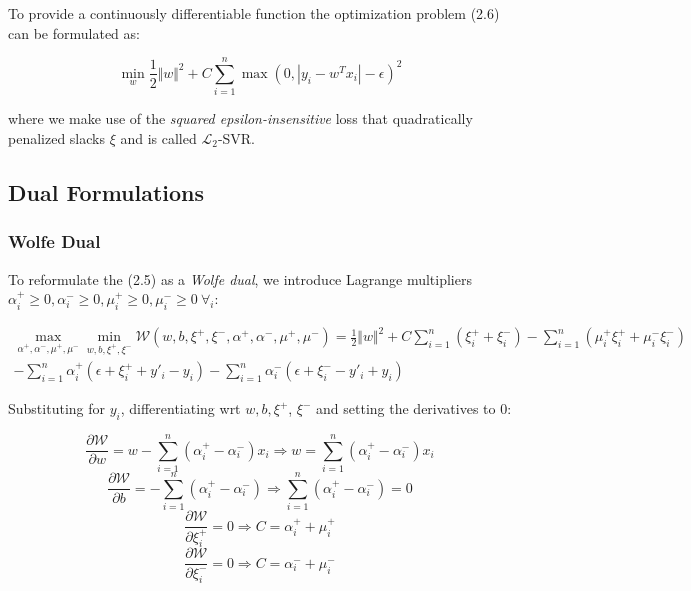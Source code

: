 To provide a continuously differentiable function the optimization problem (2.6) can be formulated as: 

\begin{equation}
    \min_ {w} \frac{1}{2} \Vert w\Vert^{2} + C \sum_{i=1}^n \max(0, |y_i - w^T x_i| - \epsilon)^2 \tag{2.7}
\end{equation}

where we make use of the \emph{squared epsilon-insensitive} loss that quadratically penalized slacks $\xi$ and is called $\mathcal{L}_2$-SVR.

\pagebreak

\subsection{Dual Formulations}

\subsubsection{Wolfe Dual}

To reformulate the (2.5) as a \emph{Wolfe dual}, we introduce Lagrange multipliers $\alpha_i^+ \geq 0, \alpha_i^- \geq 0, \mu_i^+ \geq 0, \mu_i^- \geq 0 \ \forall_i$:

\begin{align*}
    \max_{\alpha^+,\alpha^-,\mu^+,\mu^-} \min_{w,b,\xi^+,\xi^-} \mathcal{W}(w,b,\xi^+,\xi^-,\alpha^+,\alpha^-,\mu^+,\mu^-) \displaystyle = \frac{1}{2}\Vert w\Vert^{2}+C \sum_{i=1}^n(\xi_i^+ + \xi_i^-)-\sum_{i=1}^n(\mu_i^+ \xi_i^+ + \mu_i^- \xi_i^-) \\ -\sum_{i=1}^n\alpha_i^+(\epsilon+\xi_i^+ + y'_i-y_i)-\sum_{i=1}^n\alpha_i^-(\epsilon+\xi_i^- - y'_i+y_i) \tag{2.8}
\end{align*}

Substituting for $y_i$, differentiating wrt $w, b, \xi^+$, $\xi^-$ and setting the derivatives to $0$:

\begin{equation}
    \displaystyle \frac{\partial \mathcal{W}}{\partial w}=w-\sum_{i=1}^{n}(\alpha_i^+ - \alpha_i^-) x_i \Rightarrow w=\sum_{i=1}^{n}(\alpha_i^+ - \alpha_i^-) x_i \tag{2.9}
\end{equation}
\begin{equation}
    \displaystyle \frac{\partial \mathcal{W}}{\partial b}=-\sum_{i=1}^{n}(\alpha_i^+ - \alpha_i^-)\Rightarrow \sum_{i=1}^{n}(\alpha_i^+ - \alpha_i^-)=0 \tag{2.10}
\end{equation}
\begin{equation}
    \displaystyle \frac{\partial \mathcal{W}}{\partial\xi_i^+}=0\Rightarrow C=\alpha_i^+ + \mu_i^+ \tag{2.11}
\end{equation}
\begin{equation}
    \displaystyle \frac{\partial \mathcal{W}}{\partial\xi_i^-}=0\Rightarrow C=\alpha_i^- + \mu_i^- \tag{2.12}
\end{equation}

